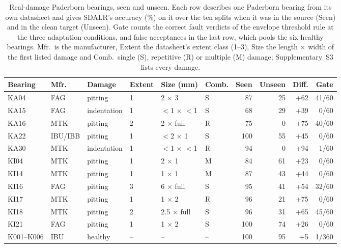 \begin{table}[htbp]
\centering
\begingroup
\small
\setlength{\tabcolsep}{4pt}
\begin{tabular}{llllllrrrr}
\toprule
Bearing & Mfr. & Damage & Extent & Size (mm) & Comb. & Seen & Unseen & Diff. & Gate \\
\midrule
KA04 & FAG & pitting & 1 & 2 $\times$ 3 & S & 87 & 25 & +62 & 41/60 \\
KA15 & FAG & indentation & 1 & $<$1 $\times$ $<$1 & S & 68 & 29 & +39 & 0/60 \\
KA16 & MTK & pitting & 2 & 2 $\times$ full & R & 75 & 0 & +75 & 40/60 \\
KA22 & IBU/IBB & pitting & 1 & $<$2 $\times$ 1 & S & 100 & 55 & +45 & 0/60 \\
KA30 & MTK & indentation & 1 & $<$1 $\times$ $<$1 & R & 94 & 0 & +94 & 1/60 \\
KI04 & MTK & pitting & 1 & 2 $\times$ 1 & M & 84 & 61 & +23 & 0/60 \\
KI14 & MTK & pitting & 1 & 1 $\times$ 1 & M & 87 & 43 & +44 & 0/60 \\
KI16 & FAG & pitting & 3 & 6 $\times$ full & S & 95 & 41 & +54 & 32/60 \\
KI17 & MTK & pitting & 1 & 1 $\times$ 2 & R & 96 & 21 & +75 & 0/60 \\
KI18 & MTK & pitting & 2 & 2.5 $\times$ full & S & 96 & 31 & +65 & 45/60 \\
KI21 & FAG & pitting & 1 & 1 $\times$ 2 & S & 100 & 74 & +26 & 0/60 \\
\midrule
K001--K006 & IBU & healthy & -- & -- & -- & 100 & 95 & +5 & 1/360 \\
\bottomrule
\end{tabular}\par
\endgroup
\caption{Real-damage Paderborn bearings, seen and unseen. Each row describes one Paderborn bearing from its own datasheet and gives SDALR's accuracy (\%) on it over the ten splits when it was in the source (Seen) and in the clean target (Unseen). Gate counts the correct fault verdicts of the envelope threshold rule at the three adaptation conditions, and false acceptances in the last row, which pools the six healthy bearings. Mfr.\ is the manufacturer, Extent the datasheet's extent class (1--3), Size the length $\times$ width of the first listed damage and Comb.\ single (S), repetitive (R) or multiple (M) damage; Supplementary~S3 lists every damage.}
\label{tab:bearings}
\end{table}
